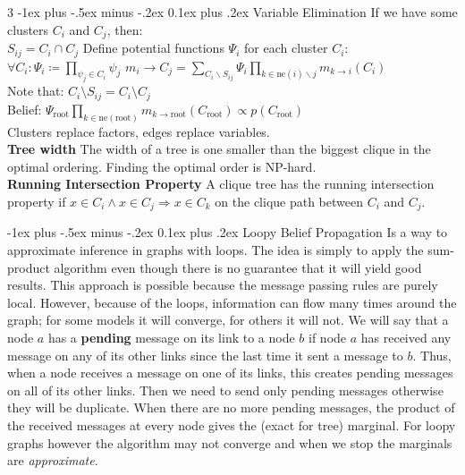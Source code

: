 \documentclass[a4paper,landscape]{amsmlaj}
\makeatletter
\renewcommand{\subsubsection}{\@startsection{subsubsection}{3}{0mm}
	{-1ex plus -.5ex minus -.2ex}
	{0.1ex plus .2ex}
	{\normalfont\footnotesize\bfseries}}
\makeatother
\begin{document}
\begin{multicols*}{3}
\subsubsection{Variable Elimination}
If we have some clusters $C_i$ and $C_j$, then:\\
$ S_{ij} = C_i \cap C_j $
Define potential functions $\Psi_i$ for each cluster $C_i$:
$ \forall C_i: \Psi_i \coloneqq \prod_{\psi_j \in C_i} \psi_j$
$ m_i \rightarrow C_j = \sum_{C_i \smallsetminus  S_{ij}}
\Psi_i\prod_{k \in \mathrm{ne}(i) \smallsetminus j} m_{k \rightarrow i}(C_i)$\\
Note that: $ C_i \setminus S_{ij} = C_i \setminus C_j $\\
Belief: $ \Psi_{\text{root}} \prod_{k \in \mathrm{ne}(\text{root})} m_{k
\rightarrow \text{root}}(C_{\text{root}}) \propto
p(C_{\text{root}})$\\
Clusters replace factors, edges replace variables.\\
\textbf{Tree width} The width of a tree is one smaller than the
biggest clique in the optimal ordering. Finding the optimal
order is NP-hard.\\
\textbf{Running Intersection Property} A clique tree has the
running intersection property if $x \in C_i \land x \in C_j \Rightarrow x \in C_k$
on the clique path between $C_i$ and $C_j$.

\subsubsection{Loopy Belief Propagation}
Is a way to approximate inference in graphs with loops. The idea is simply to
apply the sum-product algorithm even though there is no guarantee that it will
yield good results. This approach is possible because the message passing rules
are purely local. However, because of the loops, information can flow many times
around the graph; for some models it will converge, for others it will not. We
will say that a node $a$ has a \textbf{pending} message on its link to a node
$b$ if node $a$ has received any message on any of its other links since the
last time it sent a message to $b$. Thus, when a node receives a message on one
of its links, this creates pending messages on all of its other links. Then we
need to send only pending messages otherwise they will be duplicate. When there
are no more pending messages, the product of the received messages at every node
gives the (exact for tree) marginal. For loopy graphs however the algorithm may
not converge and when we stop the marginals are \textit{approximate}.


\end{multicols*}
\end{document}
